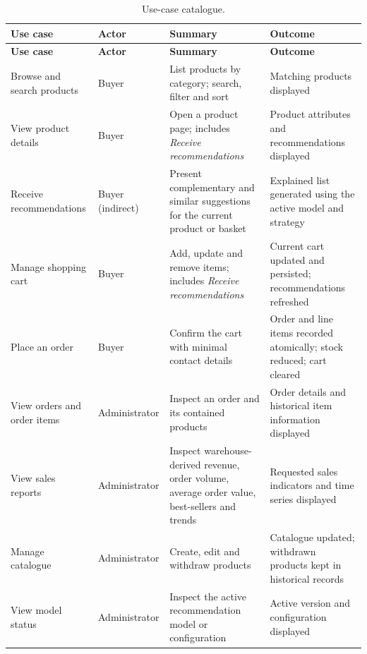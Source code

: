 \documentclass[a4paper,12pt]{article}
\newlength{\tablecontentwidth}
\newcommand{\tablestyle}{%
  \small\setstretch{1.05}%
  \renewcommand{\arraystretch}{1.25}%
  \setlength{\extrarowheight}{3pt}%
  \arrayrulecolor{tableborder}%
}
\begin{document}
{\tablestyle
\begin{longtable}{|L{0.20\tablecontentwidth}|L{0.14\tablecontentwidth}|L{0.33\tablecontentwidth}|L{0.33\tablecontentwidth}|}
  \caption{Use-case catalogue.}
  \label{tab:usecases}\\
  \hline
  \textbf{Use case} & \textbf{Actor} & \textbf{Summary} & \textbf{Outcome} \\
  \hline
  \endfirsthead
  \hline
  \textbf{Use case} & \textbf{Actor} & \textbf{Summary} & \textbf{Outcome} \\
  \hline
  \endhead
  \endfoot
  \endlastfoot
  Browse and search products & Buyer & List products by category; search, filter and sort &
    Matching products displayed \\[3pt]\hline
  View product details & Buyer & Open a product page; includes \emph{Receive recommendations} &
    Product attributes and recommendations displayed \\[3pt]\hline
  Receive recommendations & Buyer (indirect) & Present complementary and similar suggestions for
    the current product or basket & Explained list generated using the active model and strategy \\[3pt]\hline
  Manage shopping cart & Buyer & Add, update and remove items; includes \emph{Receive
    recommendations} & Current cart updated and persisted; recommendations refreshed \\[3pt]\hline
  Place an order & Buyer & Confirm the cart with minimal contact details & Order and line items
    recorded atomically; stock reduced; cart cleared \\[3pt]\hline

  View orders and order items & Administrator & Inspect an order and its contained products &
    Order details and historical item information displayed \\[3pt]\hline
  View sales reports & Administrator & Inspect warehouse-derived revenue, order volume, average
    order value, best-sellers and trends & Requested sales indicators and time series displayed \\[3pt]\hline
  Manage catalogue & Administrator & Create, edit and withdraw products & Catalogue updated;
    withdrawn products kept in historical records \\[3pt]\hline
  View model status & Administrator & Inspect the active recommendation model or configuration &
    Active version and configuration displayed \\[3pt]\hline


\end{longtable}}
\end{document}
